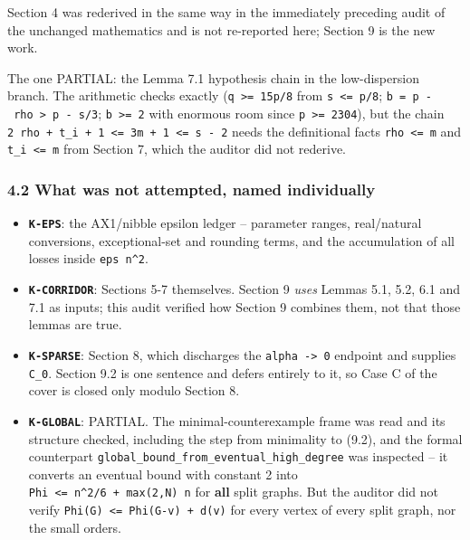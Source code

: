 \documentclass[
  10pt,
]{article}
\providecommand{\tightlist}{%
  \setlength{\itemsep}{0pt}\setlength{\parskip}{0pt}}
\begin{document}
Section 4 was rederived in the same way in the immediately preceding
audit of the unchanged mathematics and is not re-reported here; Section
9 is the new work.

The one PARTIAL: the Lemma 7.1 hypothesis chain in the low-dispersion
branch. The arithmetic checks exactly
(\texttt{q\ \textgreater{}=\ 15p/8} from \texttt{s\ \textless{}=\ p/8};
\texttt{b\ =\ p\ -\ rho\ \textgreater{}\ p\ -\ s/3};
\texttt{b\ \textgreater{}=\ 2} with enormous room since
\texttt{p\ \textgreater{}=\ 2304}), but the chain
\texttt{2\ rho\ +\ t\_i\ +\ 1\ \textless{}=\ 3m\ +\ 1\ \textless{}=\ s\ -\ 2}
needs the definitional facts \texttt{rho\ \textless{}=\ m} and
\texttt{t\_i\ \textless{}=\ m} from Section 7, which the auditor did not
rederive.

\subsubsection{4.2 What was not attempted, named
individually}\label{what-was-not-attempted-named-individually}

\begin{itemize}
\tightlist
\item
  \textbf{\texttt{K-EPS}}: the AX1/nibble epsilon ledger -- parameter
  ranges, real/natural conversions, exceptional-set and rounding terms,
  and the accumulation of all losses inside \texttt{eps\ n\^{}2}.
\item
  \textbf{\texttt{K-CORRIDOR}}: Sections 5-7 themselves. Section 9
  \emph{uses} Lemmas 5.1, 5.2, 6.1 and 7.1 as inputs; this audit
  verified how Section 9 combines them, not that those lemmas are true.
\item
  \textbf{\texttt{K-SPARSE}}: Section 8, which discharges the
  \texttt{alpha\ -\textgreater{}\ 0} endpoint and supplies
  \texttt{C\_0}. Section 9.2 is one sentence and defers entirely to it,
  so Case C of the cover is closed only modulo Section 8.
\item
  \textbf{\texttt{K-GLOBAL}}: PARTIAL. The minimal-counterexample frame
  was read and its structure checked, including the step from minimality
  to (9.2), and the formal counterpart
  \texttt{global\_bound\_from\_eventual\_high\_degree} was inspected --
  it converts an eventual bound with constant 2 into
  \texttt{Phi\ \textless{}=\ n\^{}2/6\ +\ max(2,N)\ n} for \textbf{all}
  split graphs. But the auditor did not verify
  \texttt{Phi(G)\ \textless{}=\ Phi(G-v)\ +\ d(v)} for every vertex of
  every split graph, nor the small orders.
\end{itemize}
\end{document}
